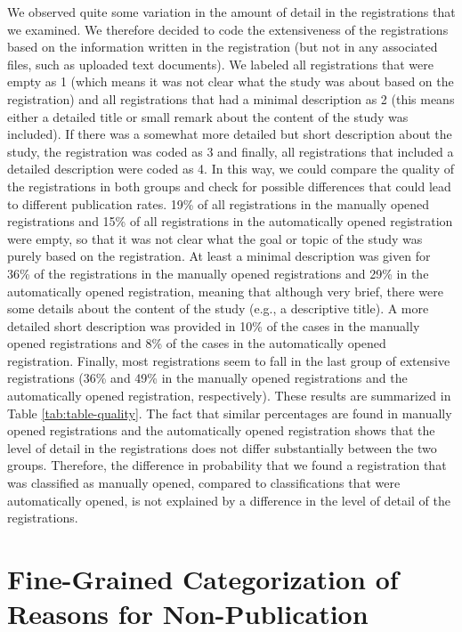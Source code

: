 \documentclass[
  ,jou, a4paper,floatsintext]{apa6}
\begin{document}
We observed quite some variation in the amount of detail in the registrations that we examined. We therefore decided to code the extensiveness of the registrations based on the information written in the registration (but not in any associated files, such as uploaded text documents). We labeled all registrations that were empty as 1 (which means it was not clear what the study was about based on the registration) and all registrations that had a minimal description as 2 (this means either a detailed title or small remark about the content of the study was included). If there was a somewhat more detailed but short description about the study, the registration was coded as 3 and finally, all registrations that included a detailed description were coded as 4. In this way, we could compare the quality of the registrations in both groups and check for possible differences that could lead to different publication rates. 19\% of all registrations in the manually opened registrations and 15\% of all registrations in the automatically opened registration were empty, so that it was not clear what the goal or topic of the study was purely based on the registration. At least a minimal description was given for 36\% of the registrations in the manually opened registrations and 29\% in the automatically opened registration, meaning that although very brief, there were some details about the content of the study (e.g., a descriptive title). A more detailed short description was provided in 10\% of the cases in the manually opened registrations and 8\% of the cases in the automatically opened registration. Finally, most registrations seem to fall in the last group of extensive registrations (36\% and 49\% in the manually opened registrations and the automatically opened registration, respectively). These results are summarized in Table \ref{tab:table-quality}. The fact that similar percentages are found in manually opened registrations and the automatically opened registration shows that the level of detail in the registrations does not differ substantially between the two groups. Therefore, the difference in probability that we found a registration that was classified as manually opened, compared to classifications that were automatically opened, is not explained by a difference in the level of detail of the registrations.

\section{Fine-Grained Categorization of Reasons for Non-Publication}\label{fine-grained-categorization-of-reasons-for-non-publication}
\end{document}
